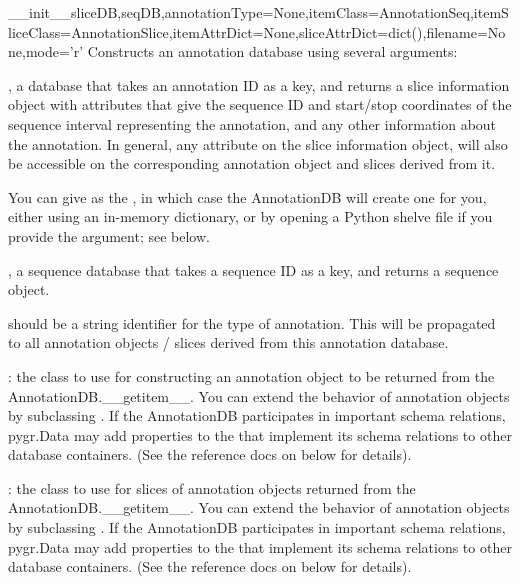 \documentclass{howto}
\begin{document}
\begin{funcdesc}{__init__}{sliceDB,seqDB,annotationType=None,itemClass=AnnotationSeq,itemSliceClass=AnnotationSlice,itemAttrDict=None,sliceAttrDict=dict(),filename=None,mode='r'}
  Constructs an annotation database using several arguments:

  , a database that takes an annotation ID as a key, and returns
  a slice information object with attributes that give the sequence ID and start/stop
  coordinates of the sequence interval representing the annotation,
  and any other information about the annotation.  In general, any
  attribute on the slice information object, will also be accessible
  on the corresponding annotation object and slices derived from it.

  You can give  as the , in which case the
  AnnotationDB will create one for you, either using an in-memory dictionary,
  or by opening a Python shelve file if you provide the  argument;
  see below.

  , a sequence database that takes a sequence ID as a key, and
  returns a sequence object.

   should be a string identifier for the type of
  annotation.  This will be propagated to all annotation objects / slices
  derived from this annotation database.

  : the class to use for constructing an annotation object 
  to be returned from the AnnotationDB.__getitem__.  You can extend the
  behavior of annotation objects by subclassing .
  If the AnnotationDB participates in important schema relations,
  pygr.Data may add properties to the  that implement
  its schema relations to other database containers.  (See the reference
  docs on  below for details).

  : the class to use for slices of annotation
  objects returned from the AnnotationDB.__getitem__.  You can extend the
  behavior of annotation objects by subclassing .
  If the AnnotationDB participates in important schema relations,
  pygr.Data may add properties to the  that implement
  its schema relations to other database containers.  (See the reference
  docs on  below for details).


\end{funcdesc}
\end{document}
